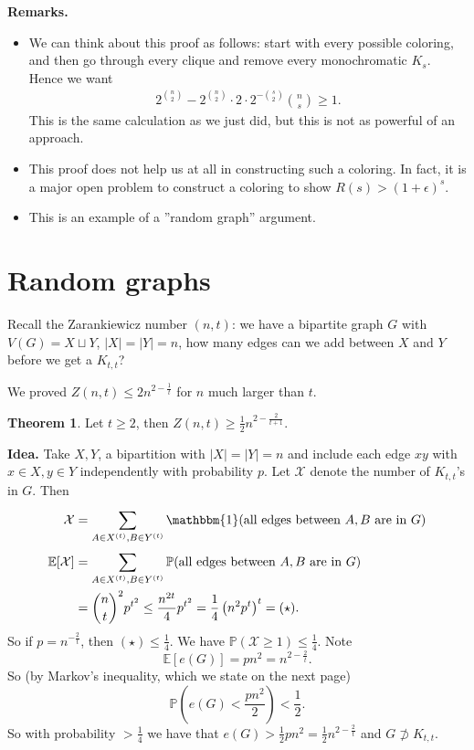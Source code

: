\documentclass{article}
\theoremstyle{definition}
\newtheorem{theorem}{Theorem}[section]
\begin{document}
\textbf{Remarks.}
\begin{itemize}
    \item We can think about this proof as follows: start with every possible coloring, and then go through every clique and remove every monochromatic $K_s$. Hence we want
    \begin{align*}
        2^{{n}\choose{2}} - 2^{{n}\choose{2}}\cdot 2\cdot 2^{-{{s}\choose{2}}} {{n}\choose{s}}\ge 1.
    \end{align*}
    This is the same calculation as we just did, but this is not as powerful of an approach.
    \item This proof does not help us at all in constructing such a coloring. In fact, it is a major open problem to construct a coloring to show $R(s)>(1+\epsilon)^s$.
    \item This is an example of a ''random graph'' argument.
\end{itemize} 

\section{Random graphs}

Recall the Zarankiewicz number $(n,t)$: we have a bipartite graph $G$ with $V(G)=X \sqcup Y$, $|X|=|Y|=n$, how many edges can we add between $X$ and $Y$ before we get a $K_{t,t}$?

We proved $Z(n,t)\le 2 n^{2-\frac{1}{t}}$ for $n$ much larger than $t$.

\begin{theorem}
    Let $t\ge 2$, then $Z(n,t)\ge \frac{1}{2}n^{2-\frac{2}{t+1}}$.
\end{theorem}
\textbf{Idea.} Take $X,Y$, a bipartition with $|X|=|Y|=n$ and include each edge $xy$ with $x \in X, y \in Y$ independently with probability $p$. Let $\mathcal{X}$ denote the number of $K_{t,t}$'s in $G$. Then 
\begin{align*}
    \mathcal{X} &= \sum_{A \in X^{(t)}, B \in Y^{(t)}}^{} \mathbbm{1}(\text{all edges between }A,B \text{ are in }G) \\
    \mathbb{E}[\mathcal{X}] &= \sum_{A \in X^{(t)}, B \in Y^{(t)}}^{} \mathbb{P}(\text{all edges between }A,B \text{ are in }G) \\
    &={{n}\choose{t}}^2 p^{t^2} \le \frac{n^{2t}}{4} p^{t^2} = \frac{1}{4}\left(n^2 p^t\right)^t = (\star).
\end{align*} 
So if $p = n^{-\frac{2}{t}}$, then $(\star)\le \frac{1}{4}$. We have $\mathbb{P}(\mathcal{X}\ge 1)\le \frac{1}{4}$. Note $$\mathbb{E}[e(G)]=pn^2 = n^{2-\frac{2}{t}}.$$
So (by Markov's inequality, which we state on the next page)\[
\mathbb{P}\left(e(G)<\frac{pn^2}{2}\right) < \frac{1}{2}.
\]
So with probability $>\frac{1}{4}$ we have that $e(G)>\frac{1}{2} pn^2 = \frac{1}{2}n^{2-\frac{2}{t}}$ and $G \not\supset K_{t,t}$.
\end{document}
